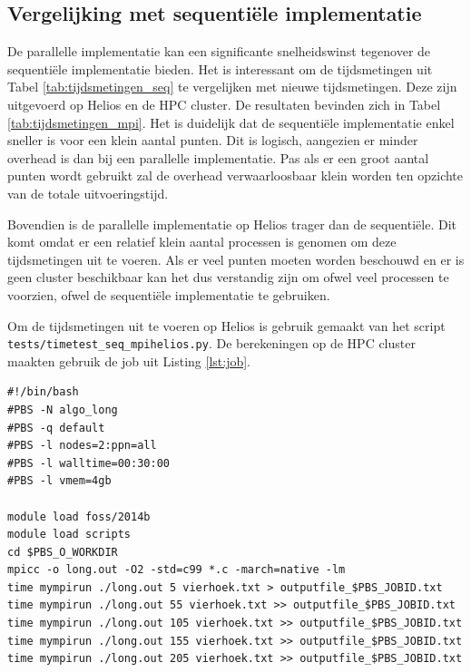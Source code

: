 \documentclass[titlepage,a4paper]{article}
\begin{document}
\subsection{Vergelijking met sequenti\"ele implementatie}
De parallelle implementatie kan een significante snelheidswinst tegenover de sequenti\"ele implementatie bieden. Het is interessant om de tijdsmetingen uit Tabel \ref{tab:tijdsmetingen_seq} te vergelijken met nieuwe tijdsmetingen. Deze zijn uitgevoerd op Helios en de HPC cluster.
De resultaten bevinden zich in Tabel \ref{tab:tijdsmetingen_mpi}.
Het is duidelijk dat de sequenti\"ele implementatie enkel sneller is voor een klein aantal punten. Dit is logisch, aangezien er minder overhead is dan bij een parallelle implementatie. Pas als er een groot aantal punten wordt gebruikt zal de overhead verwaarloosbaar klein worden ten opzichte van de totale uitvoeringstijd.

Bovendien is de parallelle implementatie op Helios trager dan de sequenti\"ele. Dit komt omdat er een relatief klein aantal processen is genomen om deze tijdsmetingen uit te voeren. Als er veel punten moeten worden beschouwd en er is geen cluster beschikbaar kan het dus verstandig zijn om ofwel veel processen te voorzien, ofwel de sequenti\"ele implementatie te gebruiken.

Om de tijdsmetingen uit te voeren op Helios is gebruik gemaakt van het script \texttt{tests/timetest\_seq\_mpihelios.py}. De berekeningen op de HPC cluster maakten gebruik de job uit Listing \ref{lst:job}.

\begin{lstlisting}[caption={HPC job},label={lst:job}]
#!/bin/bash
#PBS -N algo_long
#PBS -q default
#PBS -l nodes=2:ppn=all
#PBS -l walltime=00:30:00
#PBS -l vmem=4gb

module load foss/2014b
module load scripts
cd $PBS_O_WORKDIR
mpicc -o long.out -O2 -std=c99 *.c -march=native -lm
time mympirun ./long.out 5 vierhoek.txt > outputfile_$PBS_JOBID.txt
time mympirun ./long.out 55 vierhoek.txt >> outputfile_$PBS_JOBID.txt
time mympirun ./long.out 105 vierhoek.txt >> outputfile_$PBS_JOBID.txt
time mympirun ./long.out 155 vierhoek.txt >> outputfile_$PBS_JOBID.txt
time mympirun ./long.out 205 vierhoek.txt >> outputfile_$PBS_JOBID.txt
\end{lstlisting}
\end{document}
